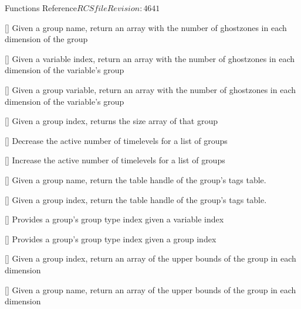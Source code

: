 \begin{cactuspart}{ Functions Reference}{$RCSfile$}{$Revision: 4641 $}
\begin{Lentry}
\item[\code{CCTK\_GroupnghostzonesGN}] [\pageref{CCTK-GroupnghostzonesGN}]
  Given a group name, return an array with the number of ghostzones
  in each dimension of the group

\item[\code{CCTK\_GroupnghostzonesVI}] [\pageref{CCTK-GroupnghostzonesVI}]
  Given a variable index, return an array with the number of ghostzones
  in each dimension of the variable's group

\item[\code{CCTK\_GroupnghostzonesVN}] [\pageref{CCTK-GroupnghostzonesVN}]
  Given a group variable, return an array with the number of ghostzones
  in each dimension of the variable's group

\item[\code{CCTK\_GroupSizesI}] [\pageref{CCTK-GroupSizesI}]
  Given a group index, returns the size array of that group

\item[\code{CCTK\_GroupStorageDecrease}] [\pageref{CCTK-GroupStorageDecrease}]
  Decrease the active number of timelevels for a list of groups

\item[\code{CCTK\_GroupStorageIncrease}] [\pageref{CCTK-GroupStorageIncrease}]
  Increase the active number of timelevels for a list of groups

\item[\code{CCTK\_GroupTagsTable}] [\pageref{CCTK-GroupTagsTable}]
  Given a group name, return the table handle of the group's tags table.

\item[\code{CCTK\_GroupTagsTableI}] [\pageref{CCTK-GroupTagsTableI}]
  Given a group index, return the table handle of the group's tags table.

\item[\code{CCTK\_GroupTypeFromVarI}] [\pageref{CCTK-GroupTypeFromVarI}]
  Provides a group's group type index given a variable index

\item[\code{CCTK\_GroupTypeI}] [\pageref{CCTK-GroupTypeI}]
  Provides a group's group type index given a group index

\item[\code{CCTK\_GroupubndGI}] [\pageref{CCTK-GroupubndGI}]
  Given a group index, return an array of the upper bounds
  of the group in each dimension

\item[\code{CCTK\_GroupubndGN}] [\pageref{CCTK-GroupubndGN}]
  Given a group name, return an array of the upper bounds
  of the group in each dimension


\end{Lentry}
\end{cactuspart}
